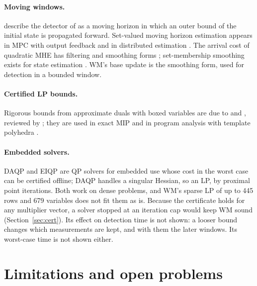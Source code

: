 \paragraph{Moving windows.} \citet[Sec.~I]{ingimundarson2005} describe the detector of \citet{kesavan2001} as a moving
horizon in which an outer bound of the initial state is propagated forward. Set-valued moving
horizon estimation appears in MPC with output feedback \citep{brunner2018,kohler2021} and in distributed estimation
\citep{segovia2022}. The arrival cost of quadratic MHE has filtering and smoothing forms
\citep{rao2001,haseltine2005}; set-membership smoothing exists for state estimation \citep{garulli1999,li2026}. WM's
base update is the smoothing form, used for detection in a bounded window.

\paragraph{Certified LP bounds.} Rigorous bounds from approximate duals with boxed variables are due to
\citet{neumaier2004} and \citet{jansson2004}, reviewed by \citet{guilbeau2017}; they are used in exact MIP
\citep{cook2013} and in program analysis with template polyhedra \citep{wang2021}.

\paragraph{Embedded solvers.} DAQP \citep{arnstrom2022} and EIQP \citep{wu2025} are QP solvers for embedded use whose
cost in the worst case can be certified offline; DAQP handles a singular Hessian, so an LP, by proximal point
iterations. Both work on dense problems, and WM's sparse LP of up to 445 rows and 679 variables does not fit them as
is. Because the certificate holds for any multiplier vector, a solver stopped at an iteration cap would keep WM sound
(Section~\ref{sec:cert}). Its effect on detection time is not shown: a looser bound changes which measurements are
kept, and with them the later windows. Its worst-case time is not shown either.

\section{Limitations and open problems}

